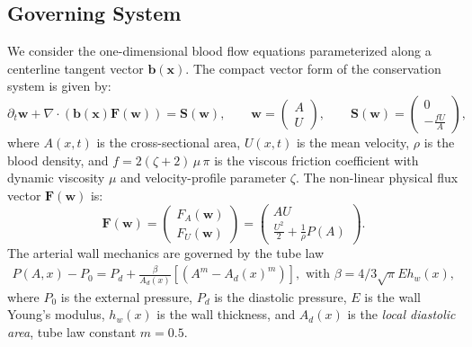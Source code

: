 \documentclass[a4paper,12pt]{article}
\begin{document}
\subsection{Governing System}
We consider the one-dimensional blood flow equations parameterized along a centerline tangent vector $\bm b(\bm x)$. The compact vector form of the conservation system is given by:
\begin{equation}
    \partial_t \mathbf{w} + \nabla \cdot \left(\bm b(\bm{x})  \mathbf{F}(\mathbf{w})\right) = \mathbf{S}(\mathbf{w}), \qquad
    \mathbf{w} = \begin{pmatrix} A \\ U \end{pmatrix}, \qquad
    \mathbf{S}(\mathbf{w}) = \begin{pmatrix} 0 \\ - \frac{f U}{A} \end{pmatrix},
\end{equation}
where $A(x,t)$ is the cross-sectional area, $U(x,t)$ is the mean velocity, $\rho$ is the blood density, and
$f = 2(\zeta+2)\,\mu\,\pi$ is the viscous friction coefficient
with dynamic viscosity $\mu$ and velocity-profile parameter
$\zeta$.
The non-linear physical flux vector $\mathbf{F}(\mathbf{w})$ is:
\begin{equation}
    \mathbf{F}(\mathbf{w}) = \begin{pmatrix} F_A(\mathbf{w}) \\ F_U(\mathbf{w}) \end{pmatrix} = \begin{pmatrix} A U \\ \frac{U^2}{2} + \frac{1}{\rho} P(A) \end{pmatrix}.
\end{equation}
The arterial wall mechanics are governed by the tube law
\begin{align*}
    P(A,x) - P_0 = P_d + \frac{\beta}{A_d(x)}
    \left[ (A^m - A_d(x)^m) \right], \text{ with }  \beta = 4/3 \sqrt{\pi} E h_w(x),
\end{align*}
where $P_0 $ is the external pressure, $P_d$ is the diastolic pressure,
$E$ is the wall Young's modulus,
$h_w(x)$ is the wall thickness, and
$A_d(x)$ is the \emph{local diastolic area}, tube law constant $m =0.5$.
\end{document}
